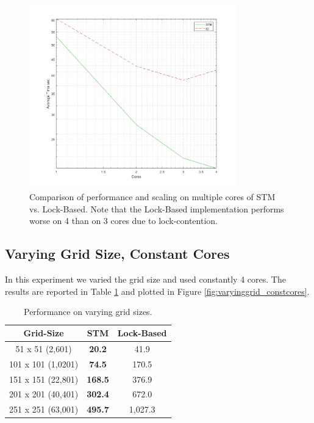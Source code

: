 \begin{figure}
	\centering
	\includegraphics[width=0.8\textwidth, angle=0]{./fig/concurrentabs/sir/core_duration_stm_io.png}
	\caption{Comparison of performance and scaling on multiple cores of STM vs. Lock-Based. Note that the Lock-Based implementation performs worse on 4 than on 3 cores due to lock-contention.}
	\label{fig:core_duration_stm_io}
\end{figure}

\subsection{Varying Grid Size, Constant Cores}
In this experiment we varied the grid size and used constantly 4 cores. The results are reported in Table \ref{tab:varyinggrid_constcores} and plotted in Figure \ref{fig:varyinggrid_constcores}.

\begin{table}
	\centering
  	\begin{tabular}{ c || c | c }
        Grid-Size          & STM              & Lock-Based  \\ \hline \hline 
   		51 x 51 (2,601)    & \textbf{20.2}    & 41.9        \\ \hline
   		101 x 101 (1,0201) & \textbf{74.5}    & 170.5       \\ \hline
   		151 x 151 (22,801) & \textbf{168.5}   & 376.9       \\ \hline
   		201 x 201 (40,401) & \textbf{302.4}   & 672.0       \\ \hline
   		251 x 251 (63,001) & \textbf{495.7}   & 1,027.3     \\ \hline \hline
  	\end{tabular}

  	\caption{Performance on varying grid sizes.}
	\label{tab:varyinggrid_constcores}
\end{table}

